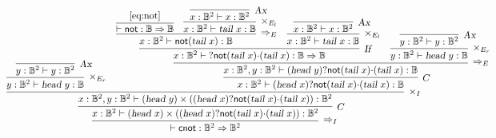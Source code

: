 \documentclass[preprint]{elsarticle}
\newcommand\B{\ensuremath{\mathbb B}}
\newcommand\ite[3]{{#1}?{#2}\mathord{\cdot}{#3}}
\newcommand\s[1]{\ensuremath{\mathsf{#1}}}
\newcommand\head{\text{\sl head}}
\newcommand\tail{\text{\sl tail}}
\newcommand\tax{\textsl{Ax}}
\newcommand\tif{\textsl{If}}
\begin{document}
\begin{equation}
  \label{eq:cnot}
  \hspace{-3cm}
  \infer[\Rightarrow_I]
  {\vdash \s{cnot}:\B^2\Rightarrow\B^2}
  {
    \infer[C]
    {x:\B^2\vdash (\head\ x)\times(\ite{(\head\ x)}{\s{not}(\tail\ x)}{(\tail\ x)}):\B^2}
    {
      \infer[\times_I]
      {x:\B^2,y:\B^2\vdash (\head\ y)\times(\ite{(\head\ x)}{\s{not}(\tail\ x)}{(\tail\ x)}):\B^2}
      {
        \infer[\times_{E_r}]
        {y:\B^2\vdash\head\ y:\B}
        {
          \infer[\tax]
          {y:\B^2\vdash y:\B^2}
          {}
        }
        &
        \infer[C]
        {x:\B^2\vdash\ite{(\head\ x)}{\s{not}(\tail\ x)}{(\tail\ x)}:\B}
        {
          \infer[\Rightarrow_E]
          {x:\B^2,y:\B^2\vdash\ite{(\head\ y)}{\s{not}(\tail\ x)}{(\tail\ x)}:\B}
          {
            \infer[\tif]{x:\B^2\vdash\ite{}{\s{not}(\tail\ x)}{(\tail\ x)}:\B\Rightarrow\B}
            {
              \infer[\Rightarrow_E]
              {x:\B^2\vdash \s{not}(\tail\ x):\B}
              {
                \infer
                {\vdash \s{not}:\B\Rightarrow\B}
                {\eqref{eq:not}}
                &
                \infer[\times_{E_l}]
                {x:\B^2\vdash\tail\ x:\B}
                {
                  \infer[\tax]
                  {x:\B^2\vdash x:\B^2}
                  {}
                }
              }
              &
              \infer[\times_{E_l}]
              {x:\B^2\vdash\tail\ x:\B}
              {
                \infer[\tax]
                {x:\B^2\vdash x:\B^2}
                {}
              }
            }
            &
            \infer[\times_{E_r}]
            {y:\B^2\vdash\head\ y:\B}
            {
              \infer[\tax]
              {y:\B^2\vdash y:\B^2}
              {}
            }
          }
        }
      }
    }
  }
\end{equation}
\end{document}
